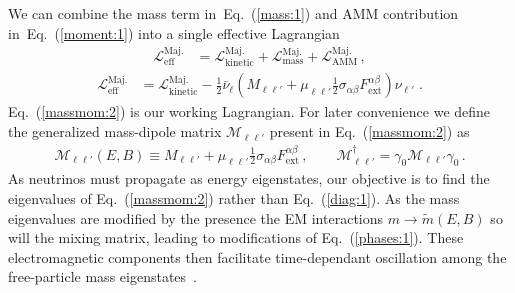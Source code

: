 \documentclass[addchapnum]{ws-rv961x669} %
\newcommand{\req}[1]{Eq.~(\ref{#1})}
\begin{document}
We can combine the mass term in~\req{mass:1} and AMM contribution in~\req{moment:1} into a single effective Lagrangian
\begin{align}
\label{massmom:1}
\mathcal{L}_\mathrm{eff}^\mathrm{Maj.} &= \mathcal{L}_\mathrm{kinetic}^\mathrm{Maj.} + \mathcal{L}_\mathrm{mass}^\mathrm{Maj.} + \mathcal{L}_\mathrm{AMM}^\mathrm{Maj.}\,,
\end{align}
%
\begin{align}
\label{massmom:2}
\mathcal{L}_\mathrm{eff}^\mathrm{Maj.} &= \mathcal{L}_\mathrm{kinetic}^\mathrm{Maj.} - \frac{1}{2}\bar\nu_{\ell}\left(M_{\ell\ell'}+\mu_{\ell\ell'}\frac{1}{2}\sigma_{\alpha\beta}F^{\alpha\beta}_\mathrm{ext}\right)\nu_{\ell'}\;.
\end{align}
\req{massmom:2} is our working Lagrangian. For later convenience we define the generalized mass-dipole matrix $\mathcal{M}_{\ell\ell'}$ present in \req{massmom:2} as
\begin{align}
\label{massmom:3}
\mathcal{M}_{\ell\ell'}(E,B)\equiv M_{\ell\ell'}+\mu_{\ell\ell'}\frac{1}{2}\sigma_{\alpha\beta}F^{\alpha\beta}_\mathrm{ext}\,,\qquad \mathcal{M}_{\ell\ell'}^{\dag}=\gamma_{0}\mathcal{M}_{\ell\ell'}\gamma_{0}\,.
\end{align}
As neutrinos must propagate as energy eigenstates, our objective is to find the eigenvalues of \req{massmom:2} rather than \req{diag:1}. As the mass eigenvalues are modified by the presence the EM interactions $m\rightarrow\widetilde m(E,B)$ so will the mixing matrix, leading to modifications of \req{phases:1}. These electromagnetic components then facilitate time-dependant oscillation among the free-particle mass eigenstates~\cite{Giunti:2014ixa}.

\end{document}
